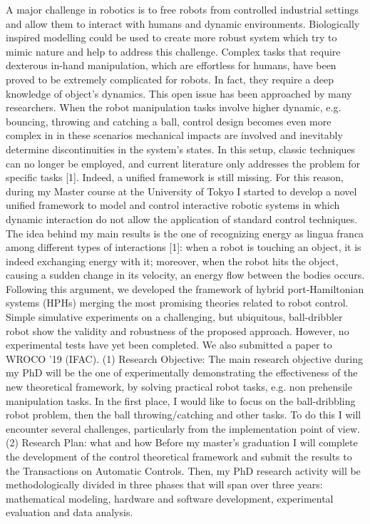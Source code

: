\clearpage
\iffalse
A major challenge in robotics is to free robots from controlled industrial settings and allow them to interact with humans and dynamic environments. Biologically inspired modelling could be used to create more robust system which try to mimic nature and help to address this challenge. Complex tasks that require dexterous in-hand manipulation, which are effortless for humans, have been proved to be extremely complicated for robots. In fact, they require a deep knowledge of object’s dynamics. This open issue has been approached by many researchers. When the robot manipulation tasks involve higher dynamic, e.g. bouncing, throwing and catching a ball, control design becomes even more complex in in these scenarios mechanical impacts are involved and inevitably determine discontinuities in the system’s states. In this setup, classic techniques can no longer be employed, and current literature only addresses the problem for specific tasks [1]. Indeed, a unified framework is still missing. For this reason, during my Master course at the University of Tokyo I started to develop a novel unified framework to model and control interactive robotic systems in which dynamic interaction do not allow the application of standard control techniques. The idea behind my main results is the one of recognizing energy as lingua franca among different types of interactions [1]: when a robot is touching an object, it is indeed exchanging energy with it; moreover, when the robot hits the object, causing a sudden change in its velocity, an energy flow between the bodies occurs. Following this argument, we developed the framework of hybrid port-Hamiltonian systems (HPHs) merging the most promising theories related to robot control. Simple simulative experiments on a challenging, but ubiquitous, ball-dribbler robot show the validity and robustness of the proposed approach. However, no experimental tests have yet been completed. We also submitted a paper to WROCO ’19 (IFAC).
(1) Research Objective: 
The main research objective during my PhD will be the one of experimentally demonstrating the effectiveness of the new theoretical framework, by solving practical robot tasks, e.g. non prehensile manipulation tasks. In the first place, I would like to focus on the ball-dribbling robot problem, then the ball throwing/catching and other tasks. To do this I will encounter several challenges, particularly from the implementation point of view.
(2) Research Plan: what and how 
Before my master’s graduation I will complete the development of the control theoretical framework and submit the results to the Transactions on Automatic Controls. Then, my PhD research activity will be methodologically divided in three phases that will span over three years: mathematical modeling, hardware and software development, experimental evaluation and data analysis.
